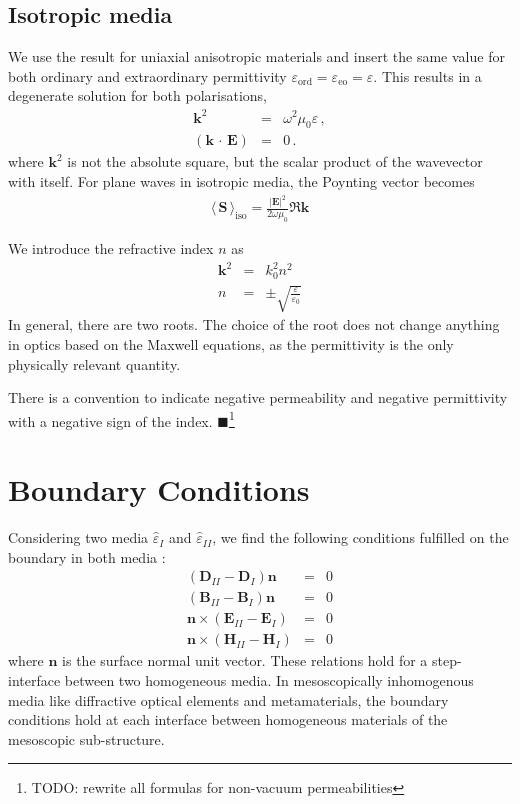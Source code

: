 \documentclass[12pt,a4paper,twoside,openright,BCOR10mm,headsepline,titlepage,abstracton,chapterprefix,final]{scrreprt}
\newcommand\Vector[1]{{\mathbf{#1}}}
\newcommand\vacuum{0}
\newcommand\wavenumber{k}
\newcommand\Wavevector{\Vector{\wavenumber}}
\newcommand\Tensor[1]{\hat{#1}}
\newcommand{\scpm}[2]{(#1\,\cdot\,#2)}
\newcommand\scalarEfield{E}
\newcommand\scalarBfield{B}
\newcommand\scalarHfield{H}
\newcommand\scalarDfield{D}
\newcommand\Efield{\Vector{\scalarEfield}}
\newcommand\Bfield{\Vector{\scalarBfield}}
\newcommand\Hfield{\Vector{\scalarHfield}}
\newcommand\Dfield{\Vector{\scalarDfield}}
\newcommand\vacuumpermeability{\scalarpermeability_{\vacuum}}
\newcommand\scalarpermeability{\mu}
\newcommand\permittivity{\Tensor{\scalarpermittivity}}
\newcommand\vacuumpermittivity{\scalarpermittivity_{\vacuum}}
\newcommand\scalarpermittivity{\varepsilon}
\newcommand\ordi{\text{ord}}
\newcommand\eo{\text{eo}}
\newcommand\materialone{I}
\newcommand\materialtwo{{II}}
\newcommand{\timeavg}[1]{{\langle\,#1\,\rangle}}
\newcommand{\remark}[1]{{\color{red}$\blacksquare$}\footnote{{\color{red}#1}}}
\begin{document}
\subsection{Isotropic media}

We use the result for uniaxial anisotropic materials and insert the same value for both ordinary and extraordinary permittivity $\scalarpermittivity_{\ordi} = \scalarpermittivity_{\eo} = \scalarpermittivity$.
This results in a degenerate solution for both polarisations,
\begin{eqnarray}
 \Wavevector^2 &=& \omega^2 \vacuumpermeability \scalarpermittivity\,, \\
 \scpm{\Wavevector}{\Efield} &=& 0\,.
\end{eqnarray}
where $\Wavevector^2$ is not the absolute square, but the scalar product of the wavevector with itself.
For plane waves in isotropic media, the Poynting vector becomes 
\begin{eqnarray}
 \timeavg{\Vector{S}}_\text{iso} = \frac{ |\Efield|^2 }{ 2\omega\vacuumpermeability } \Re \Wavevector
\end{eqnarray}

We introduce the refractive index $n$ as
\begin{eqnarray}
 \Wavevector^2 &=& k_0^2 n^2 \\
 n &=& \pm \sqrt{ \frac{\scalarpermittivity}{\vacuumpermittivity} }
\end{eqnarray}
In general, there are two roots. 
The choice of the root does not change anything in optics based on the Maxwell equations, as the permittivity is the only physically relevant quantity.

There is a convention to indicate negative permeability and negative permittivity with a negative sign of the index.
\remark{TODO: rewrite all formulas for non-vacuum permeabilities}

\section{Boundary Conditions}
Considering two media $\permittivity_\materialone$ and $\permittivity_\materialtwo$, we find the following conditions fulfilled on the boundary in both media \cite{Jackson}:
\begin{subequations}
\begin{eqnarray}
 ( \Dfield_\materialtwo - \Dfield_\materialone ) \Vector{n} &=& 0 \\
 ( \Bfield_\materialtwo - \Bfield_\materialone ) \Vector{n} &=& 0 \\
 \Vector{n} \times ( \Efield_\materialtwo - \Efield_\materialone ) &=& 0 \\
 \Vector{n} \times ( \Hfield_\materialtwo - \Hfield_\materialone ) &=& 0 
\end{eqnarray}
\label{eq:boundary_conditions} 
\end{subequations}
where $\Vector{n}$ is the surface normal unit vector.
These relations hold for a step-interface between two homogeneous media. 
In mesoscopically inhomogenous media like  diffractive optical elements and metamaterials, 
the boundary conditions hold at each interface between homogeneous materials of the mesoscopic sub-structure.
\end{document}
